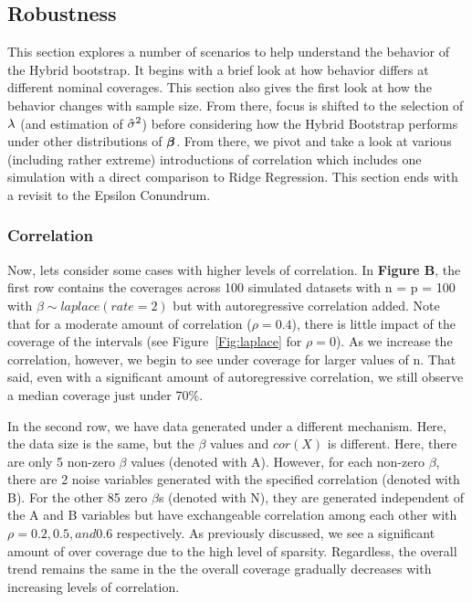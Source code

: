 \subsection{Robustness}

This section explores a number of scenarios to help understand the behavior of the Hybrid bootstrap. It begins with a brief look at how behavior differs at different nominal coverages. This section also gives the first look at how the behavior changes with sample size. From there, focus is shifted to the selection of $\lambda$ (and estimation of $\hat{\sigma}^2$) before considering how the Hybrid Bootstrap performs under other distributions of $\boldsymbol{\beta}$. From there, we pivot and take a look at various (including rather extreme) introductions of correlation which includes one simulation with a direct comparison to Ridge Regression. This section ends with a revisit to the Epsilon Conundrum.

\subsubsection{Correlation}

Now, lets consider some cases with higher levels of correlation. In \textbf{Figure B}, the first row contains the coverages across 100 simulated datasets with n = p = 100 with $\beta \sim laplace(rate = 2)$ but with autoregressive correlation added. Note that for a moderate amount of correlation ($\rho = 0.4$), there is little impact of the coverage of the intervals (see Figure~\ref{Fig:laplace} for $\rho = 0$).  As we increase the correlation, however, we begin to see under coverage for larger values of n. That said, even with a significant amount of autoregressive correlation, we still observe a median coverage just under 70\%.

In the second row, we have data generated under a different mechanism. Here, the data size is the same, but the $\beta$ values and $cor(X)$ is different. Here, there are only 5 non-zero $\beta$ values (denoted with A). However, for each non-zero $\beta$, there are 2 noise variables generated with the specified correlation (denoted with B). For the other 85 zero $\beta$s (denoted with N), they are generated independent of the A and B variables but have exchangeable correlation among each other with $\rho = 0.2, 0.5, and 0.6$ respectively. As previously discussed, we see a significant amount of over coverage due to the high level of sparsity. Regardless, the overall trend remains the same in the the overall coverage gradually decreases with increasing levels of correlation.

